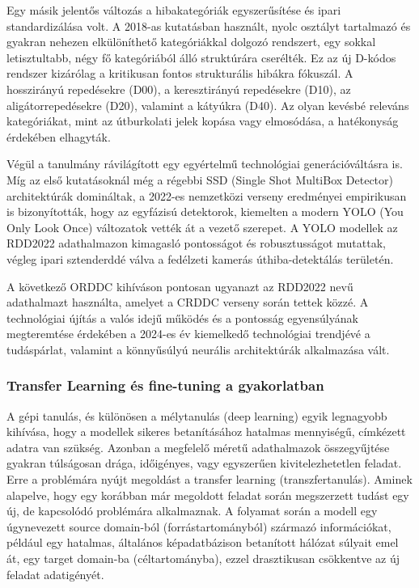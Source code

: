 Egy másik jelentős változás a hibakategóriák egyszerűsítése és ipari
standardizálása volt. A 2018-as kutatásban használt, nyolc osztályt
tartalmazó és gyakran nehezen elkülöníthető kategóriákkal dolgozó
rendszert, egy sokkal letisztultabb, négy fő kategóriából álló
struktúrára cserélték. Ez az új D-kódos rendszer kizárólag a kritikusan
fontos strukturális hibákra fókuszál. A hosszirányú repedésekre (D00), a
keresztirányú repedésekre (D10), az aligátorrepedésekre (D20), valamint
a kátyúkra (D40). Az olyan kevésbé releváns kategóriákat, mint az
útburkolati jelek kopása vagy elmosódása, a hatékonyság érdekében
elhagyták.

Végül a tanulmány rávilágított egy egyértelmű technológiai
generációváltásra is. Míg az első kutatásoknál még a régebbi SSD (Single
Shot MultiBox Detector) architektúrák domináltak, a 2022-es nemzetközi
verseny eredményei empirikusan is bizonyították, hogy az egyfázisú
detektorok, kiemelten a modern YOLO (You Only Look Once) változatok
vették át a vezető szerepet. A YOLO modellek az RDD2022 adathalmazon
kimagasló pontosságot és robusztusságot mutattak, végleg ipari
sztenderddé válva a fedélzeti kamerás úthiba-detektálás
területén. \cite{aryaCrowdsensingbasedRoadDamage2022}

A következő ORDDC kihíváson pontosan ugyanazt az
RDD2022 nevű adathalmazt használta, amelyet a CRDDC
verseny során tettek közzé. A technológiai újítás a valós idejű működés
és a pontosság egyensúlyának megteremtése érdekében a 2024-es év
kiemelkedő technológiai trendjévé a tudáspárlat, valamint a könnyűsúlyú
neurális architektúrák alkalmazása vált. \cite{aryaORDDC2024StateArt2024}

\subsubsection{\texorpdfstring{ Transfer Learning és fine-tuning a gyakorlatban}{ Transfer Learning és fine-tuning a gyakorlatban}}

A gépi tanulás, és különösen a mélytanulás (deep learning) egyik
legnagyobb kihívása, hogy a modellek sikeres betanításához hatalmas
mennyiségű, címkézett adatra van szükség. Azonban a megfelelő méretű
adathalmazok összegyűjtése gyakran túlságosan drága, időigényes, vagy
egyszerűen kivitelezhetetlen feladat. Erre a problémára nyújt megoldást
a transfer learning (transzfertanulás). Aminek alapelve, hogy egy
korábban már megoldott feladat során megszerzett tudást egy új, de
kapcsolódó problémára alkalmaznak. A folyamat során a modell egy
úgynevezett source domain-ból (forrástartományból) származó
információkat, például egy hatalmas, általános képadatbázison betanított
hálózat súlyait emel át, egy target domain-ba (céltartományba), ezzel
drasztikusan csökkentve az új feladat adatigényét.\cite{zhuangComprehensiveSurveyTransfer2021}

